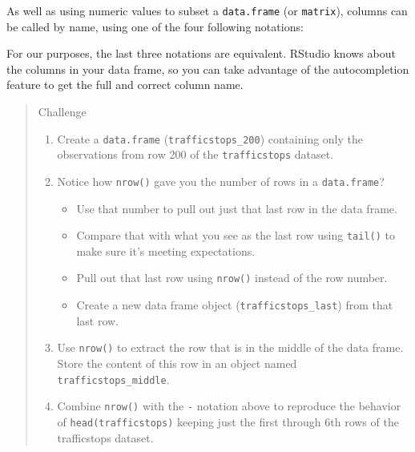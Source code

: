 \documentclass[]{book}
\newenvironment{Shaded}{\begin{snugshade}}{\end{snugshade}}
\newcommand{\StringTok}[1]{\textcolor[rgb]{0.31,0.60,0.02}{{#1}}}
\newcommand{\CommentTok}[1]{\textcolor[rgb]{0.56,0.35,0.01}{\textit{{#1}}}}
\newcommand{\NormalTok}[1]{{#1}}
\providecommand{\tightlist}{%
  \setlength{\itemsep}{0pt}\setlength{\parskip}{0pt}}
\theoremstyle{definition}
\theoremstyle{definition}
\theoremstyle{remark}
\begin{document}
As well as using numeric values to subset a \texttt{data.frame} (or
\texttt{matrix}), columns can be called by name, using one of the four
following notations:

\begin{Shaded}
\end{Shaded}

For our purposes, the last three notations are equivalent. RStudio knows
about the columns in your data frame, so you can take advantage of the
autocompletion feature to get the full and correct column name.

\begin{quote}
Challenge

\begin{enumerate}
\def\labelenumi{\arabic{enumi}.}
\item
  Create a \texttt{data.frame} (\texttt{trafficstops\_200}) containing
  only the observations from row 200 of the \texttt{trafficstops}
  dataset.
\item
  Notice how \texttt{nrow()} gave you the number of rows in a
  \texttt{data.frame}?

  \begin{itemize}
  \tightlist
  \item
    Use that number to pull out just that last row in the data frame.
  \item
    Compare that with what you see as the last row using \texttt{tail()}
    to make sure it's meeting expectations.
  \item
    Pull out that last row using \texttt{nrow()} instead of the row
    number.
  \item
    Create a new data frame object (\texttt{trafficstops\_last}) from
    that last row.
  \end{itemize}
\item
  Use \texttt{nrow()} to extract the row that is in the middle of the
  data frame. Store the content of this row in an object named
  \texttt{trafficstops\_middle}.
\item
  Combine \texttt{nrow()} with the \texttt{-} notation above to
  reproduce the behavior of \texttt{head(trafficstops)} keeping just the
  first through 6th rows of the trafficstops dataset.
\end{enumerate}
\end{quote}
\end{document}
